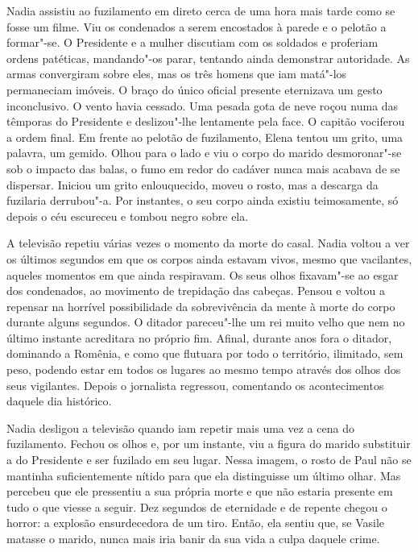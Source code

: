 \bigskip

Nadia assistiu ao fuzilamento em direto cerca de uma hora mais tarde
como se fosse um filme. Viu os condenados a serem encostados à parede
e o pelotão a formar"-se. O Presidente e a mulher discutiam com os
soldados e proferiam ordens patéticas, mandando"-os parar, tentando ainda
demonstrar autoridade. As armas convergiram sobre eles, mas os três
homens que iam matá"-los permaneciam imóveis. O braço do único oficial
presente eternizava um gesto inconclusivo. O vento havia cessado. Uma
pesada gota de neve roçou numa das têmporas do Presidente e deslizou"-lhe
lentamente pela face. O capitão vociferou a ordem final. Em frente ao
pelotão de fuzilamento, Elena tentou um grito, uma palavra, um gemido.
Olhou para o lado e viu o corpo do marido desmoronar"-se sob o impacto
das balas, o fumo em redor do cadáver nunca mais acabava de se dispersar. Iniciou um grito enlouquecido, moveu o rosto, mas
a descarga da fuzilaria derrubou"-a. Por instantes, o seu corpo ainda
existiu teimosamente, só depois o céu escureceu e tombou negro sobre
ela.

A televisão repetiu várias vezes o momento da morte do casal. Nadia
voltou a ver os últimos segundos em que os corpos ainda estavam vivos,
mesmo que vacilantes, aqueles momentos em que ainda respiravam. Os
seus olhos fixavam"-se ao esgar dos condenados, ao movimento de
trepidação das cabeças. Pensou e voltou a repensar na horrível
possibilidade da sobrevivência da mente à morte do corpo durante alguns
segundos. O ditador pareceu"-lhe um rei muito velho que nem no último
instante acreditara no próprio fim. Afinal, durante anos fora o ditador,
dominando a Romênia, e como que flutuara por todo o território,
ilimitado, sem peso, podendo estar em todos os lugares ao mesmo tempo
através dos olhos dos seus vigilantes. Depois o jornalista regressou,
comentando os acontecimentos daquele dia histórico.

Nadia desligou a televisão quando iam repetir mais uma
vez a cena do fuzilamento. Fechou os olhos e, por um instante, viu a
figura do marido substituir a do Presidente e ser fuzilado em seu lugar.
Nessa imagem, o rosto de Paul não se mantinha suficientemente nítido
para que ela distinguisse um último olhar. Mas percebeu que ele
pressentiu a sua própria morte e que não estaria presente em tudo o que
viesse a seguir. Dez segundos de eternidade e de repente chegou o
horror: a explosão ensurdecedora de um tiro. Então, ela sentiu que, se
Vasile matasse o marido, nunca mais iria banir da sua vida a culpa
daquele crime.

